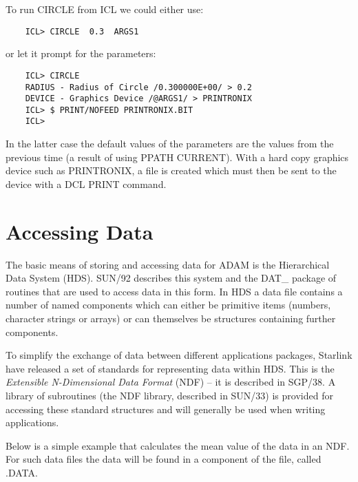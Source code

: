 \documentclass[twoside,11pt]{report}
\newcommand{\xlabel}[1]{}
\begin{document}
To run CIRCLE from ICL we could either use:

\begin{verbatim}
    ICL> CIRCLE  0.3  ARGS1
\end{verbatim}

or let it prompt for the parameters:

\begin{verbatim}
    ICL> CIRCLE
    RADIUS - Radius of Circle /0.300000E+00/ > 0.2
    DEVICE - Graphics Device /@ARGS1/ > PRINTRONIX
    ICL> $ PRINT/NOFEED PRINTRONIX.BIT
    ICL>
\end{verbatim}

In the latter case the default values of the parameters are the values from the
previous time (a result of using PPATH CURRENT). With a hard copy graphics
device such as PRINTRONIX, a file is created which must then be sent to
the device with a DCL PRINT command.

\section{\xlabel{accessing_data}Accessing Data}
\label{accdat}
The basic means of storing and accessing data for ADAM is the Hierarchical
Data System (HDS). SUN/92 describes this system
and the DAT\_ package of routines that are used to access data in this form.
In HDS a data file contains a number of named components which can
either be primitive items (numbers, character strings or arrays) or can
themselves be structures containing further components.

To simplify the exchange of data between different applications packages,
Starlink have released a set of standards for representing data within HDS.
This is the {\em Extensible N-Dimensional Data Format} (NDF) -- it is
described in SGP/38. A library of subroutines (the NDF library, described in
SUN/33) is provided for accessing these standard structures and will generally
be used when writing applications.

Below is a simple example that calculates the mean value of the data in
an NDF. For such data files the data will be found in a component
of the file, called .DATA.
\end{document}
